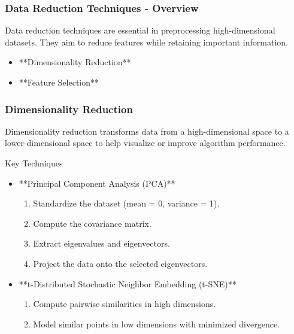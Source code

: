 \documentclass{beamer}
\begin{document}
\begin{frame}[fragile]
    \frametitle{Data Reduction Techniques - Overview}
    Data reduction techniques are essential in preprocessing high-dimensional datasets. They aim to reduce features while retaining important information.
    \begin{itemize}
        \item **Dimensionality Reduction**
        \item **Feature Selection**
    \end{itemize}
\end{frame}

\begin{frame}[fragile]
    \frametitle{Dimensionality Reduction}
    Dimensionality reduction transforms data from a high-dimensional space to a lower-dimensional space to help visualize or improve algorithm performance.
    
    \begin{block}{Key Techniques}
        \begin{itemize}
            \item **Principal Component Analysis (PCA)**
            \begin{enumerate}
                \item Standardize the dataset (mean = 0, variance = 1).
                \item Compute the covariance matrix.
                \item Extract eigenvalues and eigenvectors.
                \item Project the data onto the selected eigenvectors.
            \end{enumerate}
            \item **t-Distributed Stochastic Neighbor Embedding (t-SNE)**
            \begin{enumerate}
                \item Compute pairwise similarities in high dimensions.
                \item Model similar points in low dimensions with minimized divergence.
            \end{enumerate}
        \end{itemize}
    \end{block}
\end{frame}
\end{document}
